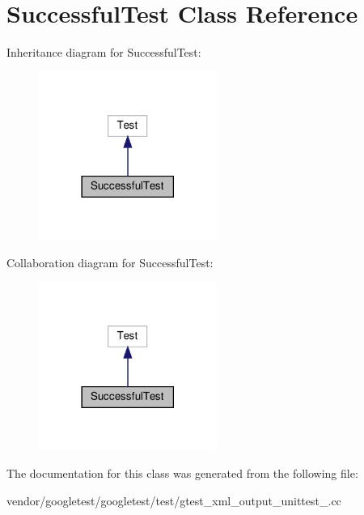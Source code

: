 \hypertarget{class_successful_test}{}\section{Successful\+Test Class Reference}
\label{class_successful_test}


Inheritance diagram for Successful\+Test\+:
\nopagebreak
\begin{figure}[H]
\begin{center}
\leavevmode
\includegraphics[width=165pt]{class_successful_test__inherit__graph}
\end{center}
\end{figure}


Collaboration diagram for Successful\+Test\+:
\nopagebreak
\begin{figure}[H]
\begin{center}
\leavevmode
\includegraphics[width=165pt]{class_successful_test__coll__graph}
\end{center}
\end{figure}


The documentation for this class was generated from the following file\+:\begin{DoxyCompactItemize}
\item 
vendor/googletest/googletest/test/gtest\+\_\+xml\+\_\+output\+\_\+unittest\+\_\+.\+cc\end{DoxyCompactItemize}
